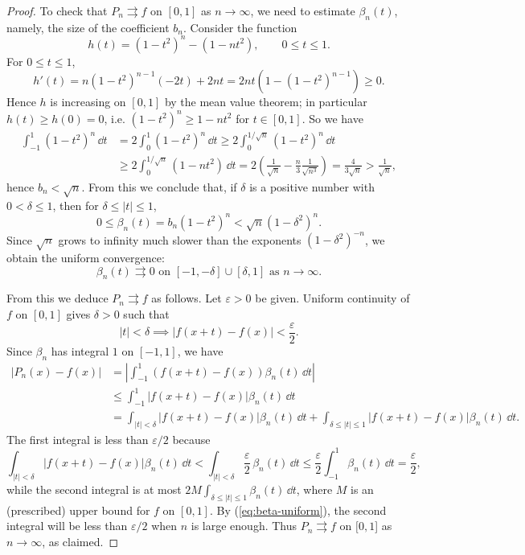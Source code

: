 \documentclass[11pt]{article}
\begin{document}
\begin{proof}
  To check that $P_n \rightrightarrows f$ on $[0,1]$ as $n \to \infty$, we need to estimate $\beta_n(t)$, namely, the size of the coefficient $b_n$.
  Consider the function
  \[
    h(t) = (1 - t^2)^n - (1 - nt^2), \qquad 0 \leqslant t \leqslant 1.
  \]
  For $0 \leqslant t \leqslant 1$,
  \[
    h'(t) = n (1-t^2)^{n-1} (-2t) + 2nt = 2nt \left( 1 - (1-t^2)^{n-1} \right) \geqslant 0.
  \]
  Hence $h$ is increasing on $[0,1]$ by the mean value theorem; in particular $h(t) \geqslant h(0) = 0$, i.e. $(1-t^2)^n \geqslant 1 - nt^2$ for $t \in [0,1]$.
  So we have
  \begin{align*}
    \int_{-1}^1 (1 - t^2)^n \, \dd t &= 2 \int_0^1 (1 - t^2)^n \, \dd t \geqslant 2 \int_0^{1/\sqrt{n}} (1 - t^2)^n \, \dd t \\
    &\geqslant 2 \int_0^{1/\sqrt{n}} (1 - nt^2) \, \dd t = 2 \left( \frac{1}{\sqrt{n}} - \frac{n}{3} \frac{1}{\sqrt{n^3}} \right) = \frac{4}{3 \sqrt{n}} > \frac{1}{\sqrt{n}},
  \end{align*}
  hence $b_n < \sqrt{n}$.
  From this we conclude that, if $\delta$ is a positive number with $0 < \delta \leqslant 1$, then for $\delta \leqslant |t| \leqslant 1$,
  \[
    0 \leqslant \beta_n(t) = b_n (1 - t^2)^n < \sqrt{n} (1 - \delta^2)^n.
  \]
  Since $\sqrt{n}$ grows to infinity much slower than the exponents $(1-\delta^2)^{-n}$, we obtain the uniform convergence:
  \begin{equation}
    \label{eq:beta-uniform}
    \beta_n(t) \rightrightarrows 0 \text{ on $[-1,-\delta] \cup [\delta,1]$ as $n \to \infty$.}
  \end{equation}

  From this we deduce $P_n \rightrightarrows f$ as follows.
  Let $\varepsilon > 0$ be given.
  Uniform continuity of $f$ on $[0,1]$ gives $\delta > 0$ such that
  \[
    |t| < \delta \implies | f(x+t) - f(x) | < \frac{\varepsilon}{2}.
  \]
  Since $\beta_n$ has integral $1$ on $[-1,1]$, we have
  \begin{align*}
    |P_n(x) - f(x)| &= \left| \int_{-1}^1 \left( f(x+t)-f(x) \right) \beta_n(t) \, \dd t \right| \\
    &\leqslant \int_{-1}^1 |f(x+t) - f(x)| \beta_n(t) \, \dd t \\ 
    &= \int_{|t| < \delta} |f(x+t) - f(x)| \beta_n(t) \, \dd t + \int_{\delta \leqslant |t| \leqslant 1} |f(x+t)-f(x)| \beta_n(t) \, \dd t.
  \end{align*}
  The first integral is less than $\varepsilon/2$ because
  \[
    \int_{|t| < \delta} |f(x+t) - f(x)| \beta_n(t) \, \dd t < \int_{|t|<\delta} \frac{\varepsilon}{2} \, \beta_n(t) \, \dd t \leqslant \frac{\varepsilon}{2} \int_{-1}^1 \beta_n(t) \, \dd t = \frac{\varepsilon}{2},
  \]
  while the second integral is at most $2M \int_{\delta \leqslant |t| \leqslant 1} \beta_n(t) \, \dd t$, where $M$ is an (prescribed) upper bound for $f$ on $[0,1]$. 
  By (\ref{eq:beta-uniform}), the second integral will be less than $\varepsilon/2$ when $n$ is large enough.
  Thus $P_n \rightrightarrows f$ on $[0,1$] as $n \to \infty$, as claimed.
\end{proof}
\end{document}

